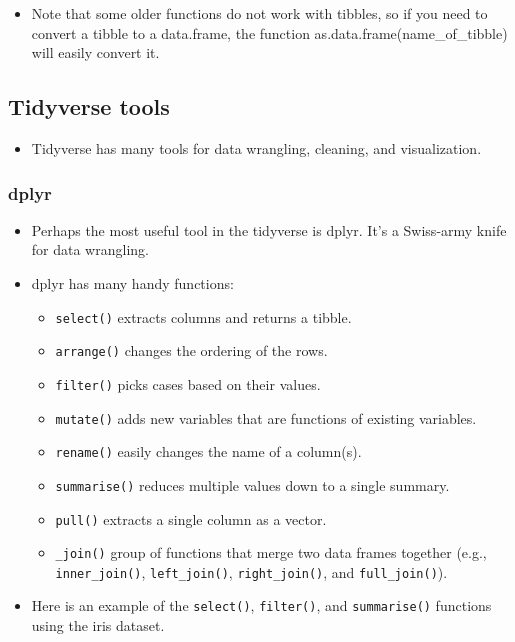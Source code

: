 \documentclass[
]{book}
\providecommand{\tightlist}{%
  \setlength{\itemsep}{0pt}\setlength{\parskip}{0pt}}
\begin{document}
\begin{itemize}
\tightlist
\item
  Note that some older functions do not work with tibbles, so if you need to convert a tibble to a data.frame, the function as.data.frame(name\_of\_tibble) will easily convert it.
\end{itemize}

\subsection{Tidyverse tools}\label{tidyverse-tools}

\begin{itemize}
\tightlist
\item
  Tidyverse has many tools for data wrangling, cleaning, and visualization.
\end{itemize}

\subsubsection{dplyr}\label{dplyr}

\begin{itemize}
\item
  Perhaps the most useful tool in the tidyverse is dplyr. It's a Swiss-army knife for data wrangling.
\item
  dplyr has many handy functions:

  \begin{itemize}
  \tightlist
  \item
    \texttt{select()} extracts columns and returns a tibble.
  \item
    \texttt{arrange()} changes the ordering of the rows.
  \item
    \texttt{filter()} picks cases based on their values.
  \item
    \texttt{mutate()} adds new variables that are functions of existing variables.
  \item
    \texttt{rename()} easily changes the name of a column(s).
  \item
    \texttt{summarise()} reduces multiple values down to a single summary.
  \item
    \texttt{pull()} extracts a single column as a vector.
  \item
    \texttt{\_join()} group of functions that merge two data frames together (e.g., \texttt{inner\_join()}, \texttt{left\_join()}, \texttt{right\_join()}, and \texttt{full\_join()}).
  \end{itemize}
\item
  Here is an example of the \texttt{select()}, \texttt{filter()}, and \texttt{summarise()} functions using the iris dataset.
\end{itemize}
\end{document}
